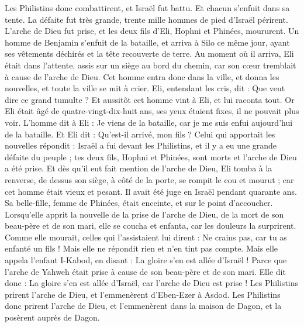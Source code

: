 \begin{multicols}{2}
Les Philistins donc combattirent, et Israël fut battu. Et chacun s'enfuit dans sa tente. La défaite fut très grande, trente mille hommes de pied d'Israël périrent.
L'arche de Dieu fut prise, et les deux fils d'Eli, Hophni et Phinées, moururent.
Un homme de Benjamin s'enfuit de la bataille, et arriva à Silo ce même jour, ayant ses vêtements déchirés et la tête recouverte de terre.
Au moment où il arriva, Eli était dans l'attente, assis sur un siège au bord du chemin, car son cœur tremblait à cause de l'arche de Dieu. Cet homme entra donc dans la ville, et donna les nouvelles, et toute la ville se mit à crier.
Eli, entendant les cris, dit : Que veut dire ce grand tumulte ? Et aussitôt cet homme vint à Eli, et lui raconta tout.
Or Eli était âgé de quatre-vingt-dix-huit ans, ses yeux étaient fixes, il ne pouvait plus voir.
L'homme dit à Eli : Je viens de la bataille, car je me suis enfui aujourd'hui de la bataille. Et Eli dit : Qu'est-il arrivé, mon fils ?
Celui qui apportait les nouvelles répondit : Israël a fui devant les Philistins, et il y a eu une grande défaite du peuple ; tes deux fils, Hophni et Phinées, sont morts et l'arche de Dieu a été prise.
Et dès qu'il eut fait mention de l'arche de Dieu, Eli tomba à la renverse, de dessus son siège, à côté de la porte, se rompit le cou et mourut ; car cet homme était vieux et pesant. Il avait été juge en Israël pendant quarante ans.
Sa belle-fille, femme de Phinées, était enceinte, et sur le point d'accoucher. Lorsqu'elle apprit la nouvelle de la prise de l'arche de Dieu, de la mort de son beau-père et de son mari, elle se coucha et enfanta, car les douleurs la surprirent.
Comme elle mourait, celles qui l'assistaient lui dirent : Ne crains pas, car tu as enfanté un fils ! Mais elle ne répondit rien et n'en tint pas compte.
Mais elle appela l'enfant I-Kabod, en disant : La gloire s'en est allée d'Israël ! Parce que l'arche de Yahweh était prise à cause de son beau-père et de son mari.
Elle dit donc : La gloire s'en est allée d'Israël, car l'arche de Dieu est prise !
\VerseOne{}Les Philistins prirent l'arche de Dieu, et l'emmenèrent d'Eben-Ezer à Asdod.
Les Philistins donc prirent l'arche de Dieu, et l'emmenèrent dans la maison de Dagon, et la posèrent auprès de Dagon.

\end{multicols}
